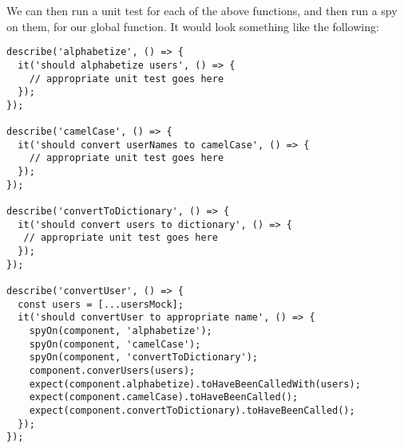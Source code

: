
We can then run a unit test for each of the above functions, and then run a spy
on them, for our global function. It would look something like the following:

\begin{lstlisting}
describe('alphabetize', () => {
  it('should alphabetize users', () => {
    // appropriate unit test goes here
  });
});

describe('camelCase', () => {
  it('should convert userNames to camelCase', () => {
    // appropriate unit test goes here
  });
});

describe('convertToDictionary', () => {
  it('should convert users to dictionary', () => {
   // appropriate unit test goes here
  });
});

describe('convertUser', () => {
  const users = [...usersMock];
  it('should convertUser to appropriate name', () => {
    spyOn(component, 'alphabetize');
    spyOn(component, 'camelCase');
    spyOn(component, 'convertToDictionary');
    component.converUsers(users);
    expect(component.alphabetize).toHaveBeenCalledWith(users);
    expect(component.camelCase).toHaveBeenCalled();
    expect(component.convertToDictionary).toHaveBeenCalled();
  });
});
\end{lstlisting}
